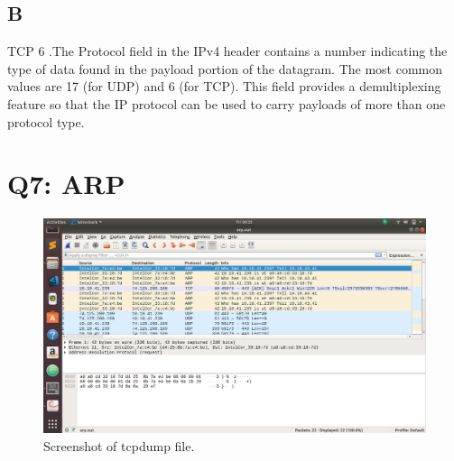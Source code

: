 \documentclass{article}
\begin{document}
\begin{table}[H]
\begin{center}
\caption{Link header format}
\label{tab:table3}
\end{center}
\end{table}

\subsection{B}
TCP 6 .The Protocol field in the IPv4 header contains a number indicating the type of data found in the payload portion of the datagram. The most common values are 17 (for UDP) and 6 (for TCP). This field provides a demultiplexing feature so that the IP protocol can be used to carry payloads of more than one protocol type.

\section{Q7: ARP}
 \begin{figure}[H]
 \centering
 \includegraphics[width=1.0\textwidth]{../Q7/arp.png}
 \caption{\label{fig:ARP}Screenshot of tcpdump file.}
 \end{figure}
\end{document}
